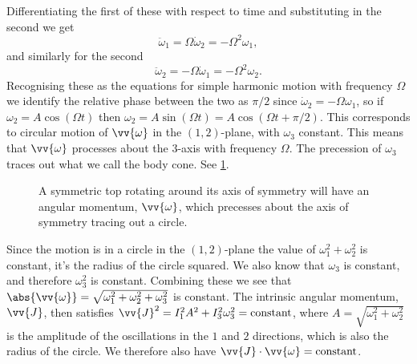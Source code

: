 \documentclass[fleqn]{NotesClass}
\begin{document}
    Differentiating the first of these with respect to time and substituting in the second we get
    \begin{equation}
        \ddot{\omega}_1 = \Omega\dot{\omega}_2 = -\Omega^2\omega_1,
    \end{equation}
    and similarly for the second
    \begin{equation}
        \ddot{\omega}_2 = -\Omega\dot{\omega}_1 = -\Omega^2\omega_2.
    \end{equation}
    Recognising these as the equations for simple harmonic motion with frequency \(\Omega\) we identify the relative phase between the two as \(\pi/2\) since \(\dot{\omega}_2 = -\Omega\omega_1\), so if \(\omega_2 = A\cos(\Omega t)\) then \(\omega_2 = A\sin(\Omega t) = A\cos(\Omega t + \pi/2)\).
    This corresponds to circular motion of \(\vv{\omega}\) in the \((1,2)\)-plane, with \(\omega_3\) constant.
    This means that \(\vv{\omega}\) processes about the \(3\)-axis with frequency \(\Omega\).
    The precession of \(\omega_3\) traces out what we call the body cone.
    See \cref{fig:symmetric top precession}.
    
    \begin{figure}
        \caption[Symmetric top precession.]{A symmetric top rotating around its axis of symmetry will have an angular momentum, \(\vv{\omega}\), which precesses about the axis of symmetry tracing out a circle.}
        \label{fig:symmetric top precession}
    \end{figure}
    
    Since the motion is in a circle in the \((1,2)\)-plane the value of \(\omega_1^2 + \omega_2^2\) is constant, it's the radius of the circle squared.
    We also know that \(\omega_3\) is constant, and therefore \(\omega_3^2\) is constant.
    Combining these we see that \(\abs{\vv{\omega}} = \sqrt{\omega_1^2 + \omega_2^2 + \omega_3^2}\) is constant.
    The intrinsic angular momentum, \(\vv{J}\), then satisfies \(\vv{J}^2 = I_1^2A^2 + I_3^2\omega_3^2 = \text{constant}\), where \(A = \sqrt{\omega_1^2 + \omega_2^2}\) is the amplitude of the oscillations in the \(1\) and \(2\) directions, which is also the radius of the circle.
    We therefore also have \(\vv{J} \cdot \vv{\omega} = \text{constant}\).
    
\end{document}
